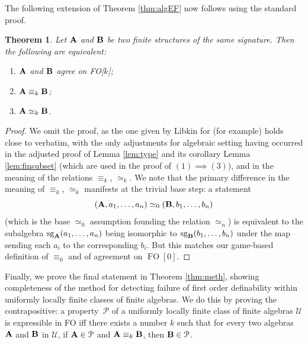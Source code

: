 \documentclass[reqno]{amsart}
\theoremstyle{plain}
\newtheorem{thm}{Theorem}[section]
\theoremstyle{definition}
\newcommand{\up}[1]{\textup{#1}}
\newcommand{\sg}[2]{\mathrm{sg}_{#1}(#2)}
\newcommand{\FO}{\operatorname{FO}}
\begin{document}
 The following extension of Theorem \ref{thm:algEF} now follows using the standard proof. 
\begin{thm}
Let ${\bf A}$ and ${\bf B}$ be two finite structures of the same signature. Then the following are equivalent:
\begin{enumerate}
\item ${\bf A}$ and ${\bf B}$ agree on FO[$k$]\up;
\item ${\bf A}\equiv_k{\bf B}$\up;
\item ${\bf A}\simeq_k{\bf B}$.
\end{enumerate}
\end{thm}
\begin{proof}
We omit the proof, as the one given by Libkin for \cite[Theorem~3.18]{lib} (for example) holds close to verbatim, with the only adjustments for algebraic setting having occurred in the adjusted proof of Lemma \ref{lem:type} and its corollary Lemma \ref{lem:finsubset} (which are used in the proof of $(1)\implies(3)$), and in the meaning of the relations $\equiv_k$, $\simeq_k$.  We note that the primary difference in the meaning of $\equiv_k$, $\simeq_k$ manifests at the trivial base step: a statement
\[
({\bf A},a_1,\dots,a_n)\simeq_0({\bf B},b_1,\dots,b_n)
\]
(which is the base $\simeq_0$ assumption founding the relation $\simeq_n$) is equivalent to the subalgebra $\sg{\bf A}{a_1,\dots,a_n}$ being isomorphic to $\sg{\bf B}{b_1,\dots,b_n}$ under the map sending each $a_i$ to the corresponding $b_i$.  But this matches our game-based definition of $\equiv_0$ and of agreement on $\FO[0]$.
\end{proof}

Finally, we prove the final statement in Theorem \ref{thm:meth}, showing completeness of the method for detecting failure of first order definability within uniformly locally finite classes of finite algebras. We do this by proving the contrapositive: a property~$\mathcal{P}$ of a uniformly locally finite class of finite algebras $\mathscr{U}$ is expressible in FO iff there exists a number $k$ such that for every two algebras ${\bf A}$ and ${\bf B}$ in $\mathscr{U}$, if ${\bf A}\in\mathcal{P}$ and ${\bf A}\equiv_k{\bf B}$, then ${\bf B}\in\mathcal{P}$.
\end{document}
